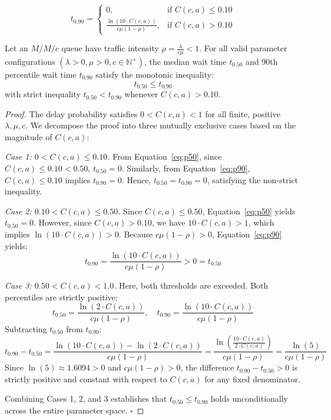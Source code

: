 \documentclass[preprint,12pt,authoryear]{elsarticle}
\begin{document}
\begin{equation}
\label{eq:p90}
t_{0.90} = 
\begin{cases} 
0, & \text{if } C(c, a) \le 0.10 \\ 
\frac{\ln(10 \cdot C(c, a))}{c\mu(1-\rho)}, & \text{if } C(c, a) > 0.10 
\end{cases}
\end{equation}

\begin{theorem}
\label{thm:invariant}
Let an $M/M/c$ queue have traffic intensity $\rho = \frac{\lambda}{c\mu} < 1$. For all valid parameter configurations $(\lambda > 0, \mu > 0, c \in \mathbb{N}^+)$, the median wait time $t_{0.50}$ and 90th percentile wait time $t_{0.90}$ satisfy the monotonic inequality:
\begin{equation}
t_{0.50} \le t_{0.90}
\end{equation}
with strict inequality $t_{0.50} < t_{0.90}$ whenever $C(c, a) > 0.10$.
\end{theorem}

\begin{proof}
The delay probability satisfies $0 < C(c, a) < 1$ for all finite, positive $\lambda, \mu, c$. We decompose the proof into three mutually exclusive cases based on the magnitude of $C(c, a)$:

\textit{Case 1: $0 < C(c, a) \le 0.10$.}  
From Equation~\eqref{eq:p50}, since $C(c, a) \le 0.10 < 0.50$, $t_{0.50} = 0$. Similarly, from Equation~\eqref{eq:p90}, $C(c, a) \le 0.10$ implies $t_{0.90} = 0$. Hence, $t_{0.50} = t_{0.90} = 0$, satisfying the non-strict inequality.

\textit{Case 2: $0.10 < C(c, a) \le 0.50$.}  
Since $C(c, a) \le 0.50$, Equation~\eqref{eq:p50} yields $t_{0.50} = 0$. However, since $C(c, a) > 0.10$, we have $10 \cdot C(c, a) > 1$, which implies $\ln(10 \cdot C(c, a)) > 0$. Because $c\mu(1-\rho) > 0$, Equation~\eqref{eq:p90} yields:
\begin{equation}
t_{0.90} = \frac{\ln(10 \cdot C(c, a))}{c\mu(1-\rho)} > 0 = t_{0.50}
\end{equation}

\textit{Case 3: $0.50 < C(c, a) < 1.0$.}  
Here, both thresholds are exceeded. Both percentiles are strictly positive:
\begin{equation}
t_{0.50} = \frac{\ln(2 \cdot C(c, a))}{c\mu(1-\rho)}, \quad t_{0.90} = \frac{\ln(10 \cdot C(c, a))}{c\mu(1-\rho)}
\end{equation}
Subtracting $t_{0.50}$ from $t_{0.90}$:
\begin{equation}
t_{0.90} - t_{0.50} = \frac{\ln(10 \cdot C(c, a)) - \ln(2 \cdot C(c, a))}{c\mu(1-\rho)} = \frac{\ln\left(\frac{10 \cdot C(c, a)}{2 \cdot C(c, a)}\right)}{c\mu(1-\rho)} = \frac{\ln(5)}{c\mu(1-\rho)}
\end{equation}
Since $\ln(5) \approx 1.6094 > 0$ and $c\mu(1-\rho) > 0$, the difference $t_{0.90} - t_{0.50} > 0$ is strictly positive and constant with respect to $C(c, a)$ for any fixed denominator. 

Combining Cases 1, 2, and 3 establishes that $t_{0.50} \le t_{0.90}$ holds unconditionally across the entire parameter space. $\square$
\end{proof}
\end{document}
